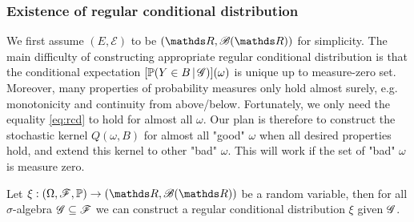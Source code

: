 \begin{unexaminable}
\subsubsection{Existence of regular conditional distribution}

We first assume $(E,\mathcal{E})$ to be $(\R,\B(\R))$ for simplicity. The main difficulty of constructing appropriate regular conditional distribution is that the conditional expectation $[\mathbb{P}(Y \in B \,|\, \mathcal{G})](\omega)$ is unique up to measure-zero set. Moreover, many properties of probability measures only hold almost surely, e.g. monotonicity and continuity from above/below. Fortunately, we only need the equality \eqref{eq:rcd} to hold for almost all $\omega$. Our plan is therefore to construct the stochastic kernel $Q(\omega,B)$ for almost all "good" $\omega$ when all desired properties hold, and extend this kernel to other "bad" $\omega$. This will work if the set of "bad" $\omega$ is measure zero.

\begin{theorem} \label{thm:existence_rcd}
Let $\xi:(\Omega,\F,\p) \to (\R,\B(\R))$ be a random variable, then for all $\sigma$-algebra $\mathcal{G} \subseteq \mathcal{F}$ we can construct a regular conditional distribution $\xi$ given $\mathcal{G}$.
\end{theorem}


\end{unexaminable}
